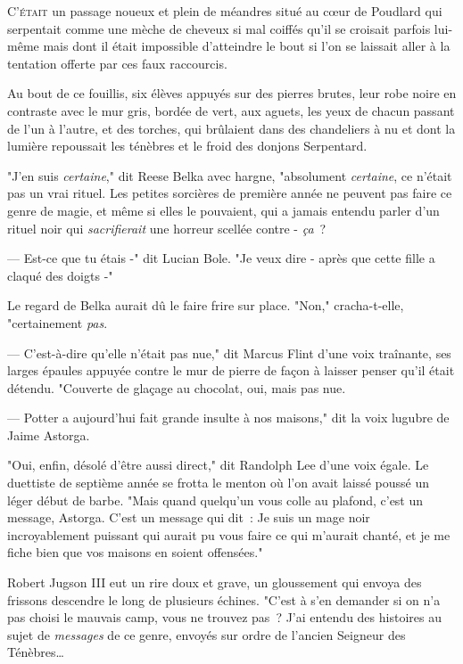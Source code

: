
\lettrine{C}{'était} un passage noueux et plein de méandres situé au cœur de Poudlard qui serpentait comme une mèche de cheveux si mal coiffés qu'il se croisait parfois lui-même mais dont il était impossible d'atteindre le bout si l'on se laissait aller à la tentation offerte par ces faux raccourcis.

Au bout de ce fouillis, six élèves appuyés sur des pierres brutes, leur robe noire en contraste avec le mur gris, bordée de vert, aux aguets, les yeux de chacun passant de l'un à l'autre, et des torches, qui brûlaient dans des chandeliers à nu et dont la lumière repoussait les ténèbres et le froid des donjons Serpentard.

"J'en suis \emph{certaine}," dit Reese Belka avec hargne, "absolument \emph{certaine}, ce n'était pas un vrai rituel. Les petites sorcières de première année ne peuvent pas faire ce genre de magie, et même si elles le pouvaient, qui a jamais entendu parler d'un rituel noir qui \emph{sacrifierait} une horreur scellée contre - \emph{ça}~?

--- Est-ce que tu étais -" dit Lucian Bole. "Je veux dire - après que cette fille a claqué des doigts -"

Le regard de Belka aurait dû le faire frire sur place. "Non," cracha-t-elle, "certainement \emph{pas}.

--- C'est-à-dire qu'elle n'était pas nue," dit Marcus Flint d'une voix traînante, ses larges épaules appuyée contre le mur de pierre de façon à laisser penser qu'il était détendu. "Couverte de glaçage au chocolat, oui, mais pas nue.

--- Potter a aujourd'hui fait grande insulte à nos maisons," dit la voix lugubre de Jaime Astorga.

"Oui, enfin, désolé d'être aussi direct," dit Randolph Lee d'une voix égale. Le duettiste de septième année se frotta le menton où l'on avait laissé poussé un léger début de barbe. "Mais quand quelqu'un vous colle au plafond, c'est un message, Astorga. C'est un message qui dit~: Je suis un mage noir incroyablement puissant qui aurait pu vous faire ce qui m'aurait chanté, et je me fiche bien que vos maisons en soient offensées."

Robert Jugson III eut un rire doux et grave, un gloussement qui envoya des frissons descendre le long de plusieurs échines. "C'est à s'en demander si on n'a pas choisi le mauvais camp, vous ne trouvez pas~? J'ai entendu des histoires au sujet de \emph{messages} de ce genre, envoyés sur ordre de l'ancien Seigneur des Ténèbres…

